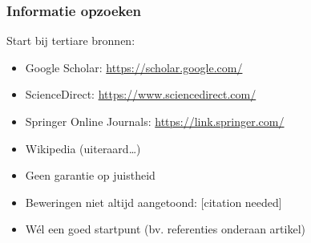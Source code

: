 \documentclass{beamer}
\begin{document}
\begin{frame}
  \frametitle{Informatie opzoeken}

  Start bij \alert{tertiare} bronnen:

  \begin{itemize}
    \item Google Scholar: \url{https://scholar.google.com/}
    \item ScienceDirect: \url{https://www.sciencedirect.com/}
    \item Springer Online Journals: \url{https://link.springer.com/}
    \item Wikipedia (uiteraard\dots)
  \end{itemize}


  \pause

  \begin{itemize}
    \item Geen garantie op juistheid
    \item Beweringen niet altijd aangetoond: [citation needed]
    \item \alert{Wél} een goed startpunt (bv. referenties onderaan artikel)
  \end{itemize}
\end{frame}
\end{document}
